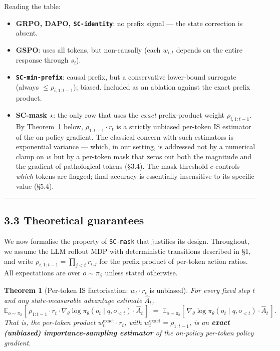 \documentclass[11pt,a4paper]{article}
\newtheorem{theorem}{Theorem}
\theoremstyle{remark}
\begin{document}
Reading the table:

\begin{itemize}[leftmargin=1.2em]
\item \textbf{GRPO, DAPO, \texttt{SC-identity}}: no prefix signal --- the state correction is absent.
\item \textbf{GSPO}: uses all tokens, but non-causally (each $w_{i,t}$ depends on the entire response through $s_i$).
\item \textbf{\texttt{SC-min-prefix}}: causal prefix, but a conservative lower-bound surrogate (always $\le \rho_{i,1:t-1}$); biased. Included as an ablation against the exact prefix product.
\item \textbf{SC-mask $\star$}: the only row that uses the \emph{exact} prefix-product weight $\rho_{i,1:t-1}$. By Theorem~\ref{thm:is-unbiased} below, $\rho_{1:t-1}\!\cdot\! r_t$ is a strictly unbiased per-token IS estimator of the on-policy gradient. The classical concern with such estimators is exponential variance --- which, in our setting, is addressed not by a numerical clamp on $w$ but by a per-token mask that zeros out both the magnitude and the gradient of pathological tokens (§3.4). The mask threshold $c$ controls \emph{which} tokens are flagged; final accuracy is essentially insensitive to its specific value (§5.4).
\end{itemize}

\vspace{0.5em}\hrule\vspace{0.5em}
\subsection*{3.3 Theoretical guarantees}

We now formalise the property of \texttt{SC-mask} that justifies its design. Throughout, we assume the LLM rollout MDP with deterministic transitions described in §1, and write $\rho_{i,1:t-1}=\prod_{j<t}r_{i,j}$ for the prefix product of per-token action ratios. All expectations are over $o\sim\pi_\beta$ unless stated otherwise.

\begin{theorem}[Per-token IS factorisation: $w_t\!\cdot\! r_t$ is unbiased]
\label{thm:is-unbiased}
For every fixed step $t$ and any state-measurable advantage estimate $\hat A_t$,
\begin{equation*}
\mathbb E_{o\sim\pi_\beta}\!\left[\,\rho_{1:t-1}\cdot r_t\cdot \nabla_\theta\log\pi_\theta(o_t\mid q,o_{<t})\cdot \hat A_t\,\right]
\;=\;
\mathbb E_{o\sim\pi_\theta}\!\left[\,\nabla_\theta\log\pi_\theta(o_t\mid q,o_{<t})\cdot \hat A_t\,\right].
\end{equation*}
That is, the per-token product $w_t^{\mathrm{exact}}\cdot r_t$, with $w_t^{\mathrm{exact}}=\rho_{1:t-1}$, is an \textbf{exact (unbiased) importance-sampling estimator} of the on-policy per-token policy gradient.
\end{theorem}
\end{document}
